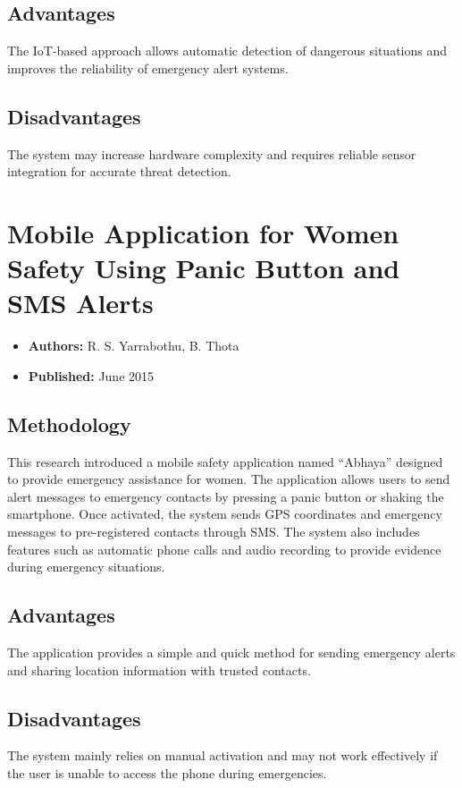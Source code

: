\documentclass[a4paper,12pt]{report}
\begin{document}
\subsection{Advantages}
\par The IoT-based approach allows automatic detection of dangerous situations and improves the reliability of emergency alert systems.

\subsection{Disadvantages}
\par The system may increase hardware complexity and requires reliable sensor integration for accurate threat detection.

\section{Mobile Application for Women Safety Using Panic Button and SMS Alerts}
\begin{itemize}
    \item \textbf{Authors:} R. S. Yarrabothu, B. Thota
    \item \textbf{Published:} June 2015
\end{itemize}

\subsection{Methodology}
\par This research introduced a mobile safety application named “Abhaya” designed to provide emergency assistance for women. The application allows users to send alert messages to emergency contacts by pressing a panic button or shaking the smartphone. Once activated, the system sends GPS coordinates and emergency messages to pre-registered contacts through SMS. The system also includes features such as automatic phone calls and audio recording to provide evidence during emergency situations.

\subsection{Advantages}
\par The application provides a simple and quick method for sending emergency alerts and sharing location information with trusted contacts.

\subsection{Disadvantages}
\par The system mainly relies on manual activation and may not work effectively if the user is unable to access the phone during emergencies.
\newpage
\end{document}
